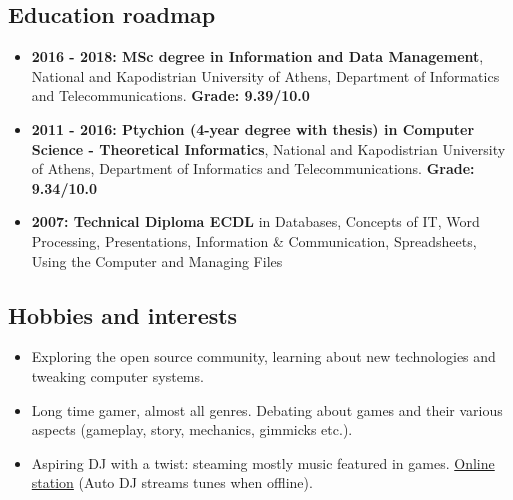 \documentclass[a4paper,oneside,10pt]{article}
\begin{document}
\subsection*{Education roadmap}

	\begin{itemize}

		\item \textbf{2016 - 2018: MSc degree in Information and Data Management}, National and Kapodistrian University of Athens, Department of Informatics and Telecommunications. \textbf{Grade: 9.39/10.0}

		\item \textbf{2011 - 2016: Ptychion (4-year degree with thesis) in Computer Science - Theoretical Informatics}, National and Kapodistrian University of Athens, Department of Informatics and Telecommunications. \textbf{Grade: 9.34/10.0}

		\item \textbf{2007: Technical Diploma ECDL} in Databases, Concepts of IT, Word Processing, Presentations, Information \& Communication, Spreadsheets, Using the Computer and Managing Files

	\end{itemize}

\subsection*{Hobbies and interests}

	\begin{itemize}

		\item Exploring the open source community, learning about new technologies and tweaking computer systems.

		\item Long time gamer, almost all genres. Debating about games and their various aspects (gameplay, story, mechanics, gimmicks etc.). 
		
		\item Aspiring DJ with a twist: steaming mostly music featured in games. \href{https://zeno.fm/the-hermit}{Online station} (Auto DJ streams tunes when offline).

	\end{itemize}
\end{document}
